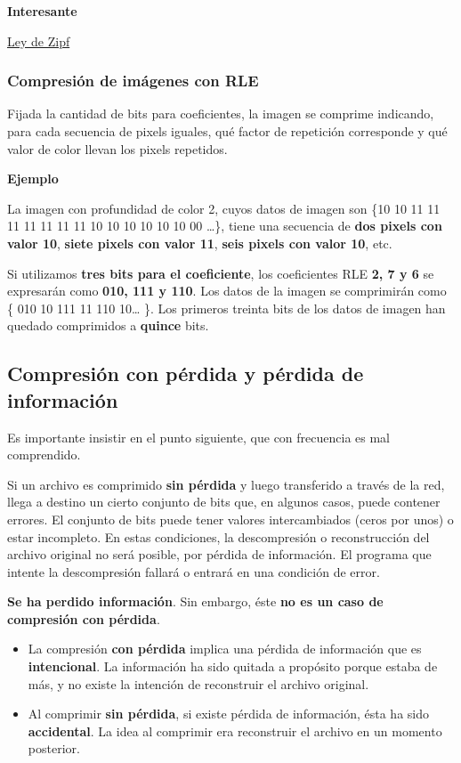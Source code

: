 \documentclass[spanish,A4,]{article}
\begin{document}
\textbf{Interesante}

\href{https://es.m.wikipedia.org/wiki/Ley_de_Zipf}{Ley de Zipf}

\subsubsection{Compresión de imágenes con
RLE}\label{compresiuxf3n-de-imuxe1genes-con-rle}

Fijada la cantidad de bits para coeficientes, la imagen se comprime
indicando, para cada secuencia de pixels iguales, qué factor de
repetición corresponde y qué valor de color llevan los pixels repetidos.

\textbf{Ejemplo}

La imagen con profundidad de color 2, cuyos datos de imagen son \{10 10
11 11 11 11 11 11 11 10 10 10 10 10 10 00 \ldots{}\}, tiene una
secuencia de \textbf{dos pixels con valor 10}, \textbf{siete pixels con
valor 11}, \textbf{seis pixels con valor 10}, etc.

Si utilizamos \textbf{tres bits para el coeficiente}, los coeficientes
RLE \textbf{2, 7 y 6} se expresarán como \textbf{010, 111 y 110}. Los
datos de la imagen se comprimirán como \{ 010 10 111 11 110 10\ldots{}
\}. Los primeros treinta bits de los datos de imagen han quedado
comprimidos a \textbf{quince} bits.

\subsection{Compresión con pérdida y pérdida de
información}\label{compresiuxf3n-con-puxe9rdida-y-puxe9rdida-de-informaciuxf3n}

Es importante insistir en el punto siguiente, que con frecuencia es mal
comprendido.

Si un archivo es comprimido \textbf{sin pérdida} y luego transferido a
través de la red, llega a destino un cierto conjunto de bits que, en
algunos casos, puede contener errores. El conjunto de bits puede tener
valores intercambiados (ceros por unos) o estar incompleto. En estas
condiciones, la descompresión o reconstrucción del archivo original no
será posible, por pérdida de información. El programa que intente la
descompresión fallará o entrará en una condición de error.

\textbf{Se ha perdido información}. Sin embargo, éste \textbf{no es un
caso de compresión con pérdida}.

\begin{itemize}
\itemsep1pt\parskip0pt
\item
  La compresión \textbf{con pérdida} implica una pérdida de información
  que es \textbf{intencional}. La información ha sido quitada a
  propósito porque estaba de más, y no existe la intención de
  reconstruir el archivo original.
\item
  Al comprimir \textbf{sin pérdida}, si existe pérdida de información,
  ésta ha sido \textbf{accidental}. La idea al comprimir era reconstruir
  el archivo en un momento posterior.
\end{itemize}
\end{document}

